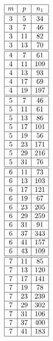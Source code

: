 \documentclass[a4paper, 10pt]{article}
\begin{document}
\begin{center}
\begin{minipage}[t]{.23\textwidth}
\begin{displaymath}
\begin{array}{|c|c|c|}
\hline
m & p & n_{1} \\ \hline
\hline
3 & 5 & 34 \\ \hline
3 & 7 & 46 \\ \hline
3 & 11 & 82 \\ \hline
3 & 13 & 70 \\ \hline
\hline
4 & 7 & 61 \\ \hline
4 & 11 & 109 \\ \hline
4 & 13 & 93 \\ \hline
4 & 17 & 69 \\ \hline
4 & 19 & 197 \\ \hline
\hline
5 & 7 & 46 \\ \hline
5 & 11 & 61 \\ \hline
5 & 13 & 86 \\ \hline
5 & 17 & 101 \\ \hline
5 & 19 & 56 \\ \hline
5 & 23 & 171 \\ \hline
5 & 29 & 216 \\ \hline
5 & 31 & 76 \\ \hline
\hline
6 & 11 & 73 \\ \hline
6 & 13 & 103 \\ \hline
6 & 17 & 121 \\ \hline
6 & 19 & 67 \\ \hline
6 & 23 & 205 \\ \hline
6 & 29 & 259 \\ \hline
6 & 31 & 91 \\ \hline
6 & 37 & 343 \\ \hline
6 & 41 & 157 \\ \hline
6 & 43 & 109 \\ \hline
\hline
7 & 11 & 85 \\ \hline
7 & 13 & 120 \\ \hline
7 & 17 & 141 \\ \hline
7 & 19 & 78 \\ \hline
7 & 23 & 239 \\ \hline
7 & 29 & 302 \\ \hline
7 & 31 & 106 \\ \hline
7 & 37 & 400 \\ \hline
7 & 41 & 183 \\ \hline

\end{array}
\end{displaymath}
\end{minipage}
\end{center}
\end{document}
